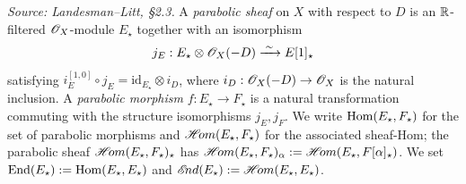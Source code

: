 \begin{definition}
  \label{def:parabolic-sheaf}
  \textit{Source: Landesman--Litt, \S2.3.}
  A \emph{parabolic sheaf} on $X$ with respect to $D$ is an $\mathbb{R}$-filtered
  $\mathscr{O}_X$-module $E_\star$ together with an isomorphism
  \[
    j_E : E_\star \otimes \mathscr{O}_X(-D) \xrightarrow{\;\sim\;} E[1]_\star
  \]
  satisfying $i_E^{[1,0]} \circ j_E = \mathrm{id}_{E_\star} \otimes i_D$, where
  $i_D : \mathscr{O}_X(-D) \to \mathscr{O}_X$ is the natural inclusion. A \emph{parabolic
  morphism} $f : E_\star \to F_\star$ is a natural transformation commuting with
  the structure isomorphisms $j_E, j_F$. We write $\operatorname{Hom}(E_\star, F_\star)$ for
  the set of parabolic morphisms and $\mathop{\mathscr{H}\!om}(E_\star, F_\star)$ for the
  associated sheaf-Hom; the parabolic sheaf $\mathop{\mathscr{H}\!om}(E_\star, F_\star)_\star$
  has $\mathop{\mathscr{H}\!om}(E_\star, F_\star)_\alpha := \mathop{\mathscr{H}\!om}(E_\star, F[\alpha]_\star)$.
  We set $\operatorname{End}(E_\star) := \operatorname{Hom}(E_\star, E_\star)$ and
  $\mathop{\mathscr{E}\!nd}(E_\star) := \mathop{\mathscr{H}\!om}(E_\star, E_\star)$.
\end{definition}

